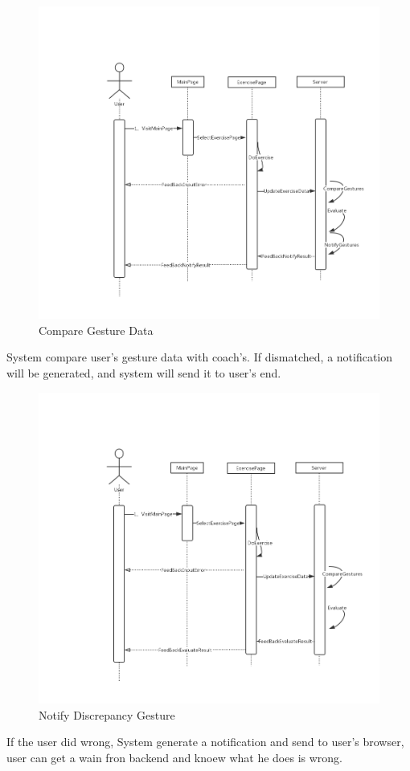 \documentclass[16pt]{scrreprt}
\begin{document}
\begin{figure}[H]
    \includegraphics[width=\linewidth]{./FuncPhoto/15.png}   
    \caption{Compare Gesture Data}
\end{figure}
System compare user's gesture data with coach's. If dismatched, a notification will be generated, and system will send it to user's end.

\begin{figure}[H]
    \includegraphics[width=\linewidth]{./FuncPhoto/16.png}   
    \caption{Notify Discrepancy Gesture }
\end{figure}
If the user did wrong, System generate a notification and send to user's browser, user can get a wain fron backend and knoew what he does is wrong.
\end{document}
